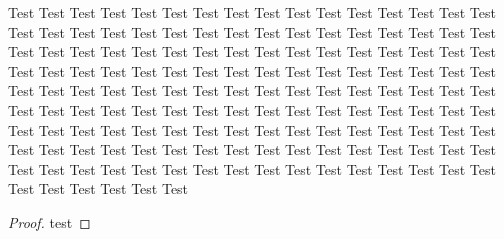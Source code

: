 \documentclass{book*}
\begin{document}
Test Test Test Test Test Test Test Test Test Test Test Test Test Test Test Test Test Test Test Test Test Test Test Test Test
Test Test Test Test Test Test Test Test Test Test Test Test Test Test Test Test Test Test Test Test Test Test Test Test Test
Test Test Test Test Test Test Test Test Test Test Test Test Test Test Test Test Test Test Test Test Test Test Test Test Test
Test Test Test Test Test Test Test Test Test Test Test Test Test Test Test Test Test Test Test Test Test Test Test Test Test
Test Test Test Test Test Test Test Test Test Test Test Test Test Test Test Test Test Test Test Test Test Test Test Test Test
Test Test Test Test Test Test Test Test Test Test Test Test Test Test Test Test Test Test Test Test Test Test Test Test Test


\begin{proof}

test

\end{proof}
\end{document}
